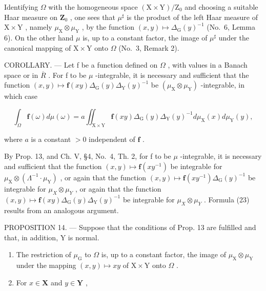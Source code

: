 Identifying \(\Omega\) with the homogeneous space \((\mathrm{X} \times \mathrm{Y}) / \mathrm{Z}_0\) and choosing a suitable Haar measure on \(\mathbf{Z}_0\) , one sees that \(\mu^\sharp\) is the product of the left Haar measure of \(\mathrm{X} \times \mathrm{Y}\) , namely \(\mu_{\mathrm{X}} \otimes \mu_{\mathrm{Y}}\) , by the function \((x, y) \mapsto \Delta_{\mathrm{G}}(y)^{-1}\) (No.~6, Lemma 6). On the other hand \(\mu\) is, up to a constant factor, the image of \(\mu^\sharp\) under the canonical mapping of \(\mathrm{X} \times \mathrm{Y}\) onto \(\Omega\) (No.~3, Remark 2).

COROLLARY. --- Let f be a function defined on \(\Omega\) , with values in a Banach space or in \(\overline{R}\) . For f to be \(\mu\) -integrable, it is necessary and sufficient that the function \((x,y)\mapsto\mathbf{f}(xy)\Delta_{\mathrm{G}}(y)\Delta_{\mathrm{Y}}(y)^{-1}\) be \((\mu_{\mathrm{X}}\otimes\mu_{\mathrm{Y}})\) -integrable, in which case

\[
\int_ {\Omega} \mathbf {f} (\omega) d \mu (\omega) = a \iint_ {\mathrm{X} \times \mathrm{Y}} \mathbf {f} (x y) \Delta_ {\mathrm{G}} (y) \Delta_ {\mathrm{Y}} (y) ^ {- 1} d \mu_ {\mathrm{X}} (x) d \mu_ {\mathrm{Y}} (y),\tag{23}
\]

where \(a\) is a constant \(>0\) independent of \(\mathbf{f}\) .

By Prop. 13, and Ch. V, §4, No.~4, Th. 2, for f to be \(\mu\) -integrable, it is necessary and sufficient that the function \((x,y)\mapsto\mathbf{f}(xy^{-1})\) be integrable for \(\mu_{\mathrm{X}}\otimes(\Lambda^{-1}\cdot\mu_{\mathrm{Y}})\) , or again that the function \((x,y)\mapsto\mathbf{f}(xy^{-1})\Delta_{\mathrm{G}}(y)^{-1}\) be integrable for \(\mu_{X}\otimes\mu_{Y}\) , or again that the function \((x,y)\mapsto\mathbf{f}(xy)\Delta_{\mathrm{G}}(y)\Delta_{\mathrm{Y}}(y)^{-1}\) be integrable for \(\mu_{X}\otimes\mu_{Y}\) . Formula (23) results from an analogous argument.

PROPOSITION 14. --- Suppose that the conditions of Prop. 13 are fulfilled and that, in addition, Y is normal.

\begin{enumerate}
\def\labelenumi{\alph{enumi})}
\item
  The restriction of \(\mu_{\mathrm{G}}\) to \(\Omega\) is, up to a constant factor, the image of \(\mu_{\mathrm{X}} \otimes \mu_{\mathrm{Y}}\) under the mapping \((x,y) \mapsto xy\) of \(\mathrm{X} \times \mathrm{Y}\) onto \(\Omega\) .
\item
  For \(x \in \mathbf{X}\) and \(y \in \mathbf{Y}\) ,
\end{enumerate}

